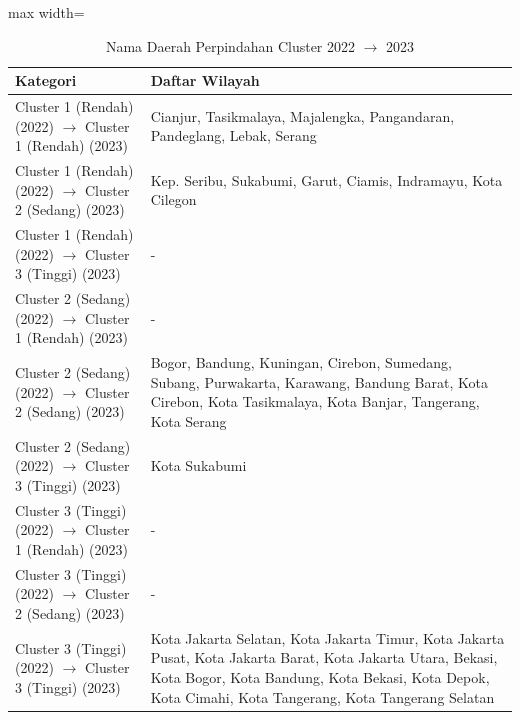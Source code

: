 \begin{table}[H]
\centering
\caption{Nama Daerah Perpindahan Cluster 2022 \(\rightarrow\) 2023} \label{tab:app2transname2022x2023}
\begin{adjustbox}{max width=\textwidth}
\begin{tabular}{|p{4cm}|p{10cm}|}
\hline
\textbf{Kategori} & \textbf{Daftar Wilayah} \\
\hline
Cluster 1 (Rendah) (2022) \(\rightarrow\) Cluster 1 (Rendah) (2023) & Cianjur, Tasikmalaya, Majalengka, Pangandaran, Pandeglang, Lebak, Serang \\
\hline
Cluster 1 (Rendah) (2022) \(\rightarrow\) Cluster 2 (Sedang) (2023) & Kep. Seribu, Sukabumi, Garut, Ciamis, Indramayu, Kota Cilegon \\
\hline
Cluster 1 (Rendah) (2022) \(\rightarrow\) Cluster 3 (Tinggi) (2023) & - \\
\hline
Cluster 2 (Sedang) (2022) \(\rightarrow\) Cluster 1 (Rendah) (2023) & - \\
\hline
Cluster 2 (Sedang) (2022) \(\rightarrow\) Cluster 2 (Sedang) (2023) & Bogor, Bandung, Kuningan, Cirebon, Sumedang, Subang, Purwakarta, Karawang, Bandung Barat, Kota Cirebon, Kota Tasikmalaya, Kota Banjar, Tangerang, Kota Serang \\
\hline
Cluster 2 (Sedang) (2022) \(\rightarrow\) Cluster 3 (Tinggi) (2023) & Kota Sukabumi \\
\hline
Cluster 3 (Tinggi) (2022) \(\rightarrow\) Cluster 1 (Rendah) (2023) & - \\
\hline
Cluster 3 (Tinggi) (2022) \(\rightarrow\) Cluster 2 (Sedang) (2023) & - \\
\hline
Cluster 3 (Tinggi) (2022) \(\rightarrow\) Cluster 3 (Tinggi) (2023) & Kota Jakarta Selatan, Kota Jakarta Timur, Kota Jakarta Pusat, Kota Jakarta Barat, Kota Jakarta Utara, Bekasi, Kota Bogor, Kota Bandung, Kota Bekasi, Kota Depok, Kota Cimahi, Kota Tangerang, Kota Tangerang Selatan \\
\hline
\end{tabular}
\end{adjustbox}
\end{table}